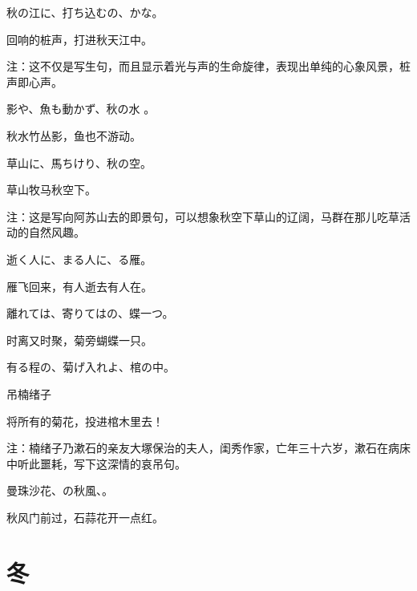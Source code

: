 \begin{haiku}
    {\FH 秋の江に、打ち込むの、かな。}

    {\FK 回响的桩声，打进秋天江中。}

    {\FT 注：这不仅是写生句，而且显示着光与声的生命旋律，表现出单纯的心象风景，桩声即心声。}
\end{haiku}

\begin{haiku}
    {\FH {}影や、魚も動かず、秋の水 。}

    {\FK 秋水竹丛影，鱼也不游动。}
\end{haiku}

\begin{haiku}
    {\FH 草山に、馬ちけり、秋の空。}

    {\FK 草山牧马秋空下。}

    {\FT 注：这是写向阿苏山去的即景句，可以想象秋空下草山的辽阔，马群在那儿吃草活动的自然风趣。}
\end{haiku}

\begin{haiku}
    {\FH 逝く人に、まる人に、る雁。}

    {\FK 雁飞回来，有人逝去有人在。}
\end{haiku}

\begin{haiku}
    {\FH 離れては、寄りてはの、蝶一つ。}

    {\FK 时离又时聚，菊旁蝴蝶一只。}
\end{haiku}

\begin{haiku}
    {\FH 有る程の、菊げ入れよ、棺の中。}

    {\FK 吊楠绪子}

    {\FK 将所有的菊花，投进棺木里去！}

    {\FT 注：楠绪子乃漱石的亲友大塚保治的夫人，闺秀作家，亡年三十六岁，漱石在病床中听此噩耗，写下这深情的哀吊句。}
\end{haiku}

\begin{haiku}
    {\FH 曼珠沙花、の秋風、。}

    {\FK 秋风门前过，石蒜花开一点红。}
\end{haiku}

\section{\FK 冬}

